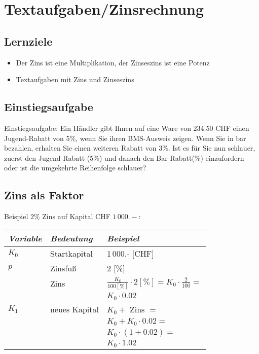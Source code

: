 
\newpage
\section{Textaufgaben/Zinsrechnung}
\subsection*{Lernziele}

\begin{itemize}
  \item Der Zins ist eine  Multiplikation, der Zinseszins ist eine Potenz
\item Textaufgaben mit Zins und Zinseszins
\end{itemize}

\subsection{Einstiegsaufgabe}
Einstiegsaufgabe:
Ein Händler gibt Ihnen auf eine Ware von 234.50 CHF einen Jugend-Rabatt von
5\%, wenn Sie ihren BMS-Ausweis zeigen. Wenn Sie in bar bezahlen, erhalten Sie
einen weiteren Rabatt von 3\%. Ist es für Sie nun schlauer, zuerst den
Jugend-Rabatt (5\%) und danach den Bar-Rabatt(\%) einzufordern oder
ist die umgekehrte Reihenfolge schlauer? 
\newpage



\subsection{Zins als Faktor}
Beispiel $2\%$ Zins auf Kapital CHF $1\,000.-$:\\

\begin{tabular}{l|l|l}
  \textit{Variable}  &   \textit{Bedeutung}   & \textit{Beispiel}\\%
\hline%
 $K_0$             &   Startkapital         & 1\,000.-  [CHF]\\\hline


 $p$               &   Zinsfuß              & 2  [\%]\\\hline

                   & Zins & $\frac{K_0}{100[\%]}\cdot{}2[\%] =
                   K_0 \cdot{} \frac2{100} = $\\
                   & & $K_0\cdot 0.02$ \\\hline

$K_1$            & neues Kapital  &   $K_0+$ Zins $=$ \\
                 &    &   $K_0+K_0\cdot{}0.02 = $ \\
                 &    &   $K_0\cdot(1+0.02) = $\\
                 &    &   $K_0\cdot{}1.02$\\
\end{tabular}

